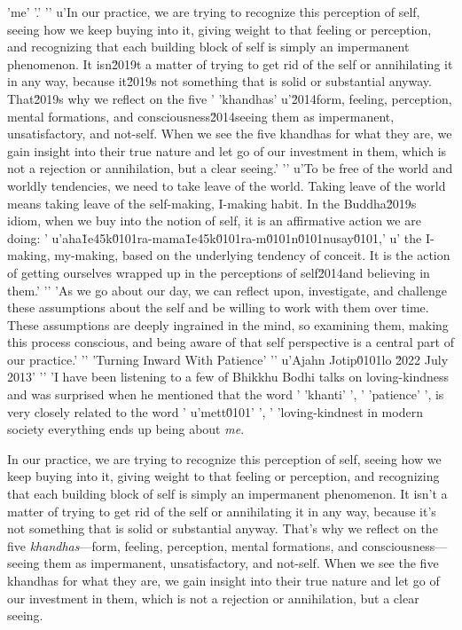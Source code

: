 'me'
'.'
'\n'
u'In our practice, we are trying to recognize this perception of self, seeing how we keep buying into it, giving weight to that feeling or perception, and recognizing that each building block of self is simply an impermanent phenomenon. It isn\u2019t a matter of trying to get rid of the self or annihilating it in any way, because it\u2019s not something that is solid or substantial anyway. That\u2019s why we reflect on the five '
'khandhas'
u'\u2014form, feeling, perception, mental formations, and consciousness\u2014seeing them as impermanent, unsatisfactory, and not-self. When we see the five khandhas for what they are, we gain insight into their true nature and let go of our investment in them, which is not a rejection or annihilation, but a clear seeing.'
'\n'
u'To be free of the world and worldly tendencies, we need to take leave of the world. Taking leave of the world means taking leave of the self-making, I-making habit. In the Buddha\u2019s idiom, when we buy into the notion of self, it is an affirmative action we are doing: '
u'aha\u1e45k\u0101ra-mama\u1e45k\u0101ra-m\u0101n\u0101nusay\u0101,'
u' the I-making, my-making, based on the underlying tendency of conceit. It is the action of getting ourselves wrapped up in the perceptions of self\u2014and believing in them.'
'\n'
'As we go about our day, we can reflect upon, investigate, and challenge these assumptions about the self and be willing to work with them over time. These assumptions are deeply ingrained in the mind, so examining them, making this process conscious, and being aware of that self perspective is a central part of our practice.'
'\n'
'Turning Inward With Patience'
'\n'
u'Ajahn Jotip\u0101lo \u2022 July 2013'
'\n'
'I have been listening to a few of Bhikkhu Bodhi talks on loving-kindness and was surprised when he mentioned that the word '
'khanti'
', '
'patience'
', is very closely related to the word '
u'mett\u0101'
', '
'loving-kindnest in 
modern society everything ends up being about \emph{me}.

In our practice, we are trying to recognize this perception of self, 
seeing how we keep buying into it, giving weight to that feeling or 
perception, and recognizing that each building block of self is simply 
an impermanent phenomenon. It isn't a matter of trying to get rid of 
the self or annihilating it in any way, because it's not something that 
is solid or substantial anyway. That's why we reflect on the five 
\emph{khandhas}---form, feeling, perception, mental formations, and 
consciousness---seeing them as impermanent, unsatisfactory, and 
not-self. When we see the five khandhas for what they are, we gain 
insight into their true nature and let go of our investment in them, 
which is not a rejection or annihilation, but a clear seeing.

